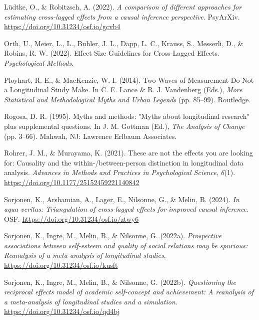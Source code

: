 \documentclass[
  man,mask,floatsintext]{apa6}
\newlength{\cslhangindent}
\newenvironment{CSLReferences}[2] %
 {\begin{list}{}{%
  \setlength{\itemindent}{0pt}
  \setlength{\leftmargin}{0pt}
  \setlength{\parsep}{0pt}
  \ifodd #1
   \setlength{\leftmargin}{\cslhangindent}
   \setlength{\itemindent}{-1\cslhangindent}
  \fi
  \setlength{\itemsep}{#2\baselineskip}}}
 {\end{list}}
\begin{document}
\begin{CSLReferences}{1}{0}
Lüdtke, O., \& Robitzsch, A. (2022). \emph{A comparison of different approaches for estimating cross-lagged effects from a causal inference perspective}. PsyArXiv. \url{https://doi.org/10.31234/osf.io/gcvb4}

Orth, U., Meier, L., L., Buhler, J. L., Dapp, L. C., Krauss, S., Messerli, D., \& Robins, R. W. (2022). Effect {Size Guidelines} for {Cross-Lagged Effects}. \emph{Psychological Methods}.

Ployhart, R. E., \& MacKenzie, W. I. (2014). Two {Waves} of {Measurement Do Not} a {Longitudinal Study Make}. In C. E. Lance \& R. J. Vandenberg (Eds.), \emph{More {Statistical} and {Methodological Myths} and {Urban Legends}} (pp. 85--99). Routledge.

Rogosa, D. R. (1995). Myths and methods: "{Myths} about longitudinal research" plus supplemental questions. In J. M. Gottman (Ed.), \emph{The {Analysis} of {Change}} (pp. 3--66). Mahwah, NJ: Lawrence Erlbaum Associates.

Rohrer, J. M., \& Murayama, K. (2021). These are not the effects you are looking for: {Causality} and the within-/between-person distinction in longitudinal data analysis. \emph{Advances in Methods and Practices in Psychological Science}, \emph{6}(1). \url{https://doi.org/10.1177/25152459221140842}

Sorjonen, K., Arshamian, A., Lager, E., Nilsonne, G., \& Melin, B. (2024). \emph{In aqua veritas: {Triangulation} of cross-lagged effects for improved causal inference}. OSF. \url{https://doi.org/10.31234/osf.io/ztwy6}

Sorjonen, K., Ingre, M., Melin, B., \& Nilsonne, G. (2022a). \emph{Prospective associations between self-esteem and quality of social relations may be spurious: {Reanalysis} of a meta-analysis of longitudinal studies}. \url{https://doi.org/10.31234/osf.io/kusft}

Sorjonen, K., Ingre, M., Melin, B., \& Nilsonne, G. (2022b). \emph{Questioning the reciprocal effects model of academic self-concept and achievement: {A} reanalysis of a meta-analysis of longitudinal studies and a simulation}. \url{https://doi.org/10.31234/osf.io/qd4bj}


\end{CSLReferences}
\end{document}
